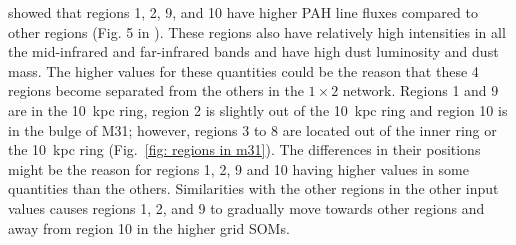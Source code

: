         \cite{Dim15} showed that regions 1, 2, 9, and 10 have higher PAH line fluxes compared to other regions (Fig. 5 in \citealt{Dim15}). 
        These regions also have relatively high intensities in all the mid-infrared and far-infrared bands and have high dust luminosity and dust mass.
        The higher values for these quantities could be the reason that these 4 regions become separated from the others in the $1\times2$ network.
        Regions 1 and 9 are in the 10~kpc ring, region 2 is slightly out of the 10~kpc ring and region 10 is in the bulge of M31; however, regions 3 to 8 are located out of the inner ring or the 10~kpc ring (Fig.~\ref{fig: regions in m31}).   
        The differences in their positions might be the reason for regions 1, 2, 9 and 10 having higher values in some quantities than the others. 
        Similarities with the other regions in the other input values causes regions 1, 2, and 9 to gradually move towards other regions and away from region 10 in the higher grid SOMs.
        
        
